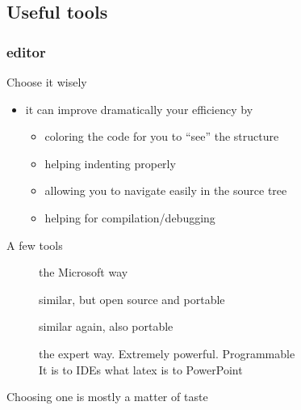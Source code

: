 \subsection[Tools]{Useful tools}

\begin{frame}[fragile]
  \frametitle{\cpp editor}
  \begin{block}{Choose it wisely}
    \begin{itemize}
    \item it can improve dramatically your efficiency by
      \begin{itemize}
      \item coloring the code for you to ``see'' the structure
      \item helping indenting properly
      \item allowing you to navigate easily in the source tree
      \item helping for compilation/debugging
      \end{itemize}
    \end{itemize}
  \end{block}
  \begin{block}{A few tools}
    \begin{description}
    \item[\href{http://www.microsoft.com/}{}]
      the Microsoft way
    \item[\href{https://www.eclipse.org/}{}]
      similar, but open source and portable
    \item[\href{https://netbeans.org/features/cpp/}{}]
      similar again, also portable
    \item[\href{http://www.gnu.org/software/emacs/}{}]
      the expert way. Extremely powerful. Programmable \\
      It is to IDEs what latex is to PowerPoint
    \end{description}
    Choosing one is mostly a matter of taste
  \end{block}
\end{frame}


